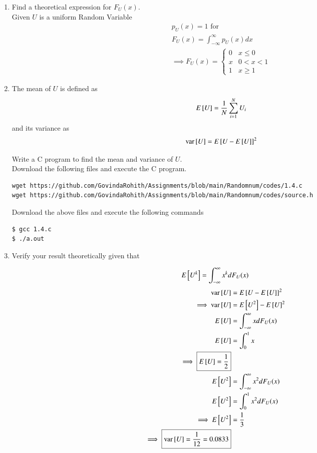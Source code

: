 \documentclass[journal,12pt,twocolumn]{IEEEtran}
\renewcommand\thesection{\arabic{section}}
\begin{document}
\begin{enumerate}[label=\thesection.\arabic*
,ref=\thesection.\theenumi]
%
\item
Find a  theoretical expression for $F_{U}(x)$.\\
\solution Given $U$ is a uniform Random Variable
\begin{align}
p_{U}(x)=1 \text{ for } \\
F_U(x)=\int_{-\infty}^{\infty}p_{U}(x)dx\\
\boxed{\implies F_U(x)=
\begin{cases}
 0 &x\le0\\
 x &0< x< 1\\
 1 &x\ge 1
\end{cases}}
\end{align}
\item
The mean of $U$ is defined as
%
\begin{equation}
E{}\left[U\right] = \frac{1}{N}\sum_{i=1}^{N}U_i
\end{equation}
%
and its variance as
%
\begin{equation}
\text{var}{}\left[U\right] = E{}\left[U- E{}\left[U\right]\right]^2 
\end{equation}

Write a C program to  find the mean and variance of $U$. \\
\solution Download the following files and execute the  C program.
\begin{lstlisting}
wget https://github.com/GovindaRohith/Assignments/blob/main/Randomnum/codes/1.4.c
wget https://github.com/GovindaRohith/Assignments/blob/main/Randomnum/codes/source.h
\end{lstlisting}
Download the above files and execute the following commands
\begin{lstlisting}
$ gcc 1.4.c
$ ./a.out
\end{lstlisting}
\item Verify your result theoretically given that
\end{enumerate}
%
\begin{equation}
E{}\left[U^k\right] = \int_{-\infty}^{\infty}x^kdF_{U}(x)
\end{equation}
\solution 
\begin{align}
    \text{var}{}\left[U\right] &= E{}\left[U- E{}\left[U\right]\right]^2\\ 
    \implies \text{var}{}\left[U\right] &= E{}\left[U^2\right]- E{}\left[U\right]^2 \\
    E{}\left[U\right]&=\int_{-\infty}^{\infty}xdF_U(x)\\
    E{}\left[U\right]&=\int_{0}^{1}x\\
    \implies \boxed{E{}\left[U\right]=\frac{1}{2}}\\
    E{}\left[U^2\right]&=\int_{-\infty}^{\infty}x^{2}dF_U(x)\\
    E{}\left[U^2\right]&=\int_{0}^{1}x^{2}dF_U(x)\\
    \implies E{}\left[U^2\right]&=\frac{1}{3}\\
    \implies \boxed{\text{var}{}\left[U\right]=\frac{1}{12}=0.0833}
\end{align}
\end{document}
